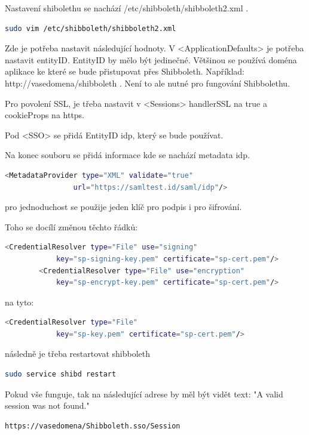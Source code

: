 Nastavení shibolethu se nachází /etc/shibboleth/shibboleth2.xml .

\begin{lstlisting}[language=Bash]
   sudo vim /etc/shibboleth/shibboleth2.xml
\end{lstlisting}

Zde je potřeba nastavit následující hodnoty. V <ApplicationDefaults> je potřeba nastavit entityID. EntityID by mělo být jedinečné. Většinou se používá doména aplikace ke které se bude přistupovat přes Shibboleth. Například: http://vasedomena/shibboleth . Není to ale nutné pro fungování Shibbolethu.

Pro povolení SSL, je třeba nastavit v <Sessions>  handlerSSL na true a cookieProps na https.

Pod <SSO> se přidá EntityID idp, který se bude používat.

Na konec souboru se přidá informace kde se nachází metadata idp.
\begin{lstlisting}[language=Bash]
 <MetadataProvider type="XML" validate="true"
                url="https://samltest.id/saml/idp"/>
\end{lstlisting}

pro jednoduchost se použije jeden klíč pro podpis i pro šifrování.

Toho se docílí změnou těchto řádků:
\begin{lstlisting}[language=Bash]
<CredentialResolver type="File" use="signing"
            key="sp-signing-key.pem" certificate="sp-cert.pem"/>
        <CredentialResolver type="File" use="encryption"
            key="sp-encrypt-key.pem" certificate="sp-cert.pem"/>
\end{lstlisting}

na tyto:
\begin{lstlisting}[language=Bash]
<CredentialResolver type="File"
            key="sp-key.pem" certificate="sp-cert.pem"/>
\end{lstlisting}

následně je třeba restartovat shibboleth
\begin{lstlisting}[language=Bash]
sudo service shibd restart
\end{lstlisting}

Pokud vše funguje, tak na následující adrese by měl být vidět text: "A valid session was not found."
\begin{lstlisting}[language=Bash]
https://vasedomena/Shibboleth.sso/Session
\end{lstlisting}

